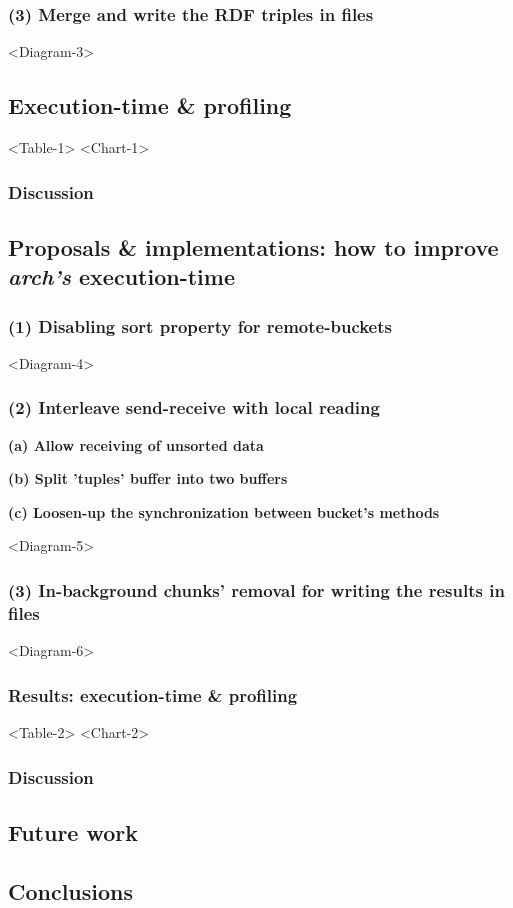 % 
\subsubsection*{(3) Merge and write the RDF triples in files}

<Diagram-3>

% 
\subsection{Execution-time \& profiling}

<Table-1>
<Chart-1>

% 
\subsubsection*{Discussion}

% 
\subsection{Proposals \& implementations: how to improve \textit{arch's} execution-time}

% 
\subsubsection*{(1) Disabling sort property for remote-buckets}

<Diagram-4>

% 
\subsubsection*{(2) Interleave send-receive with local reading}

\textbf{(a) Allow receiving of unsorted data}

\textbf{(b) Split 'tuples' buffer into two buffers}

\textbf{(c) Loosen-up the synchronization between bucket's methods}

<Diagram-5>

% 
\subsubsection*{(3) In-background chunks' removal for writing the results in files}

<Diagram-6>

% 
\subsubsection{Results: execution-time \& profiling}

<Table-2>
<Chart-2>

% 
\subsubsection*{Discussion}

\subsection{Future work}

\subsection{Conclusions}
